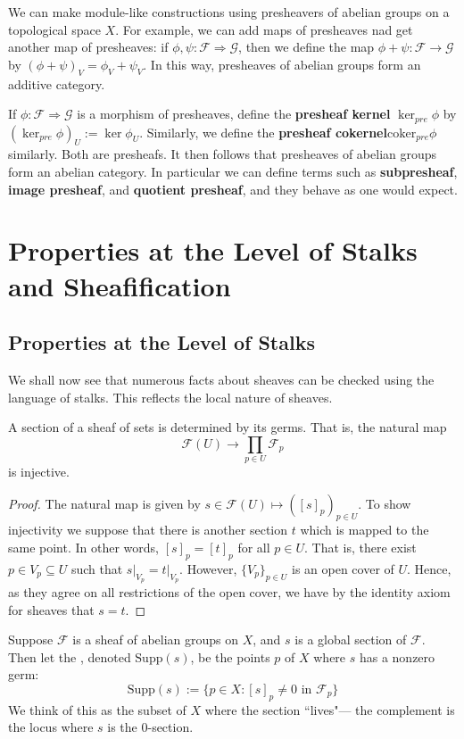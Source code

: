 We can make module-like constructions using presheavers of abelian groups on a topological space $X$. For example, we can add maps of presheaves nad get another map of presheaves: if $\phi,\psi:\mathscr{F}\Rightarrow \mathscr{G}$, then we define the map $\phi+\psi:\mathscr{F}\rightarrow \mathscr{G}$ by $(\phi+\psi)_V = \phi_V+\psi_V$. In this way, presheaves of abelian groups form an additive category.

If $\phi:\mathscr{F}\Rightarrow \mathscr{G}$ is a morphism of presheaves, define the \textbf{presheaf kernel} $\ker_{pre}\phi$ by $(\ker_{pre}\phi)_U := \ker \phi_U$. Similarly, we define the \textbf{presheaf cokernel}$ \text{coker}_{pre}\phi$ similarly. Both are presheafs. It then follows that presheaves of abelian groups form an abelian category. In particular we can define terms such as \textbf{subpresheaf}, \textbf{image presheaf}, and \textbf{quotient presheaf}, and they behave as one would expect.

\section{Properties at the Level of Stalks and Sheafification}

\subsection{Properties at the Level of Stalks}

We shall now see that numerous facts about sheaves can be checked using the language of stalks. This reflects the local nature of sheaves. 

\begin{claim}
    A section of a sheaf of sets is determined by its germs. That is, the natural map $$\mathscr{F}(U)\rightarrow \prod_{p \in U}\mathscr{F}_p$$ is injective.
\end{claim}
\begin{proof}
    The natural map is given by $s \in \mathscr{F}(U)\mapsto ([s]_p)_{p \in U}$. To show injectivity we suppose that there is another section $t$ which is mapped to the same point. In other words, $[s]_p = [t]_p$ for all $p \in U$. That is, there exist $p \in V_p \subseteq U$ such that $s\vert_{V_p} = t\vert_{V_p}$. However, $\{V_p\}_{p \in U}$ is an open cover of $U$. Hence, as they agree on all restrictions of the open cover, we have by the identity axiom for sheaves that $s = t$.
\end{proof}

\begin{definition}
    Suppose $\mathscr{F}$ is a sheaf of abelian groups on $X$, and $s$ is a global section of $\mathscr{F}$. Then let the , denoted $\text{Supp}(s)$, be the points $p$ of $X$ where $s$ has a nonzero germ: $$\text{Supp}(s) := \{p \in X:[s]_p \neq 0\text{ in }\mathscr{F}_p\}$$
    We think of this as the subset of $X$ where the section ``lives"--- the complement is the locus where $s$ is the $0$-section.
\end{definition}

